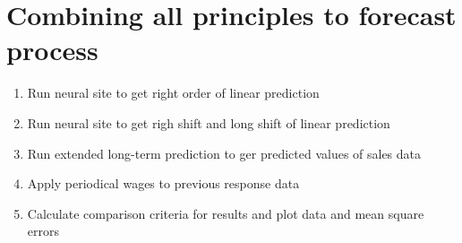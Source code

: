    \section{Combining all principles to forecast process} \label{subsec:combining_models}
    \begin{enumerate}
        \item Run neural site to get right order of linear prediction
        \item Run neural site to get righ shift and long shift of linear prediction
        \item Run extended long-term prediction to ger predicted values of sales data
        \item Apply periodical wages to previous response data
        \item Calculate comparison criteria for results and plot data and mean square errors
    \end{enumerate}
